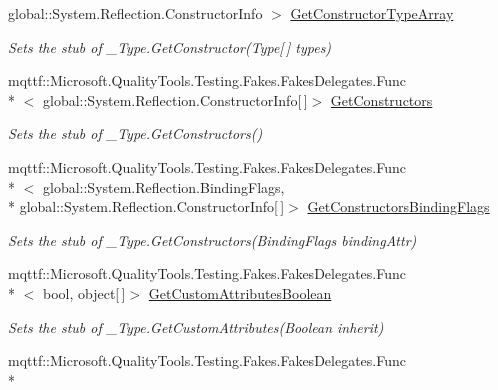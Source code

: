 \begin{DoxyCompactItemize}
global\-::\-System.\-Reflection.\-Constructor\-Info $>$ \hyperlink{class_system_1_1_runtime_1_1_interop_services_1_1_fakes_1_1_stub___type_a14e4bfe2a006bef9d63f94e62b97d867}{Get\-Constructor\-Type\-Array}
\begin{DoxyCompactList}\small\item\em Sets the stub of \-\_\-\-Type.\-Get\-Constructor(\-Type\mbox{[}$\,$\mbox{]} types)\end{DoxyCompactList}\item 
mqttf\-::\-Microsoft.\-Quality\-Tools.\-Testing.\-Fakes.\-Fakes\-Delegates.\-Func\\*
$<$ global\-::\-System.\-Reflection.\-Constructor\-Info\mbox{[}$\,$\mbox{]}$>$ \hyperlink{class_system_1_1_runtime_1_1_interop_services_1_1_fakes_1_1_stub___type_aab767f108dc7d3f25cda7d8be7977d53}{Get\-Constructors}
\begin{DoxyCompactList}\small\item\em Sets the stub of \-\_\-\-Type.\-Get\-Constructors()\end{DoxyCompactList}\item 
mqttf\-::\-Microsoft.\-Quality\-Tools.\-Testing.\-Fakes.\-Fakes\-Delegates.\-Func\\*
$<$ global\-::\-System.\-Reflection.\-Binding\-Flags, \\*
global\-::\-System.\-Reflection.\-Constructor\-Info\mbox{[}$\,$\mbox{]}$>$ \hyperlink{class_system_1_1_runtime_1_1_interop_services_1_1_fakes_1_1_stub___type_a057eeb3d4869c667ab2a0442ed2a4dcf}{Get\-Constructors\-Binding\-Flags}
\begin{DoxyCompactList}\small\item\em Sets the stub of \-\_\-\-Type.\-Get\-Constructors(\-Binding\-Flags binding\-Attr)\end{DoxyCompactList}\item 
mqttf\-::\-Microsoft.\-Quality\-Tools.\-Testing.\-Fakes.\-Fakes\-Delegates.\-Func\\*
$<$ bool, object\mbox{[}$\,$\mbox{]}$>$ \hyperlink{class_system_1_1_runtime_1_1_interop_services_1_1_fakes_1_1_stub___type_acd63edf0bfa188ae04cbf8a2221e6792}{Get\-Custom\-Attributes\-Boolean}
\begin{DoxyCompactList}\small\item\em Sets the stub of \-\_\-\-Type.\-Get\-Custom\-Attributes(\-Boolean inherit)\end{DoxyCompactList}\item 
mqttf\-::\-Microsoft.\-Quality\-Tools.\-Testing.\-Fakes.\-Fakes\-Delegates.\-Func\\*

\end{DoxyCompactItemize}
